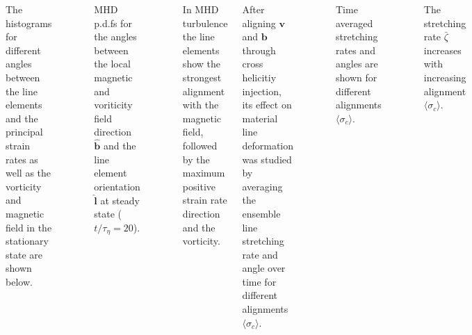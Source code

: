 \documentclass[20pt, a0paper, portrait, margin=15mm, innermargin=15mm,
     blockverticalspace=15mm, colspace=15mm, subcolspace=8mm]{tikzposter} %
\newcommand{\va}[1]{\bm{#1}}
\newcommand{\plot}[3]{
\begin{figure}[H]
    \centering
    \tiny
    \scalebox{1.3}{}
    \caption{\footnotesize{#2}}
    \label{#3}
\end{figure}
}
\begin{document}
\begin{columns}
{\begin{minipage}[t]{20cm}
				\vspace{1.0cm}


                The histograms for different angles between the line elements and the
                principal strain rates as well as the vorticity and magnetic field in the
                stationary state are shown below.

                \plot{figures/histograms/mhd_angle_histo_t20}
				{MHD p.d.fs for the angles between the local magnetic and voriticity field direction $\va{\hat{b}}$ and the
                    line element orientation $\va{\hat{l}}$ at steady state ($t/\tau_{\eta} = 20$).}
                    {mhd_strain_magnetic_angle_histo}

                \begin{itemsposter}
                    \item In MHD turbulence the line elements show the strongest
                        alignment with the magnetic field, followed by the 
                        maximum positive strain rate direction and the vorticity.
                \end{itemsposter}

            \end{minipage}
            \hfill
            \begin{minipage}[t]{20cm}


                     After aligning $\va{v}$ and $\va{b}$ through cross helicitiy
                     injection, its effect on material line deformation was
                     studied by averaging the ensemble line stretching
                     rate and angle over time for different alignments $\langle
                     \sigma_c \rangle $.

                    \plot{figures/line_xhel_scaling_128}
						{Time averaged stretching rates and angles are shown for
                        different alignments $\langle \sigma_c \rangle$.}
						{xhel_scaling}

                    \begin{itemsposter}
                        \item The stretching rate $\bar{\zeta}$ increases with
                            increasing alignment $\langle \sigma_c \rangle$.

                        \vspace{0.5cm}


\end{itemsposter}
\end{minipage}}
\end{columns}
\end{document}
